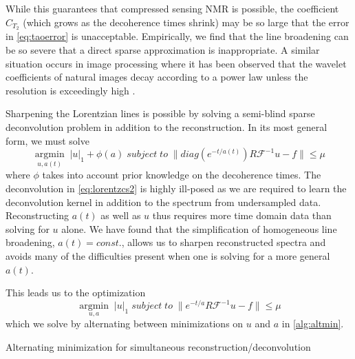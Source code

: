 \documentclass[11pt]{article}
\begin{document}
While this guarantees that compressed sensing NMR is possible, the coefficient $C_{T_2}$ (which grows as the decoherence times shrink) may be so large that the error in \cref{eq:taoerror} is unacceptable. Empirically, we find that the line broadening can be so severe that a direct sparse approximation is inappropriate. A similar situation occurs in image processing where it has been observed that the wavelet coefficients of natural images decay according to a power law unless the resolution is exceedingly high \cite{Gousseau2001}.

Sharpening the Lorentzian lines is possible by solving a semi-blind sparse deconvolution problem in addition to the reconstruction. In its most general form, we must solve
\begin{equation}\label{eq:lorentzcs2}
\underset{u,a(t)}{\operatorname{argmin}} \; |u|_1 + \phi(a) \; subject\;to \; \| diag(e^{-t/a(t)})R\mathcal{F}^{-1}u - f \| \leq \mu
\end{equation}
where $\phi$ takes into account prior knowledge on the decoherence times. The deconvolution in \cref{eq:lorentzcs2} is highly ill-posed as we are required to learn the deconvolution kernel in addition to the spectrum from undersampled data. Reconstructing $a(t)$ as well as $u$ thus requires more time domain data than solving for $u$ alone. We have found that the simplification of homogeneous line broadening, $a(t) = const.$, allows us to sharpen reconstructed spectra and avoids many of the difficulties present when one is solving for a more general $a(t)$.

This leads us to the optimization
\begin{equation}\label{eq:lorentzcs_revise}
\underset{u,a}{\operatorname{argmin}} \; |u|_1 \; subject\;to \; \| e^{-t/a}R\mathcal{F}^{-1}u - f \| \leq \mu
\end{equation}
 which we solve by alternating between minimizations on $u$ and $a$ in \cref{alg:altmin}.
\begin{algorithm}[h!]
\caption{Alternating minimization for simultaneous reconstruction/deconvolution}
\label{alg:altmin}
\end{algorithm}
\end{document}
